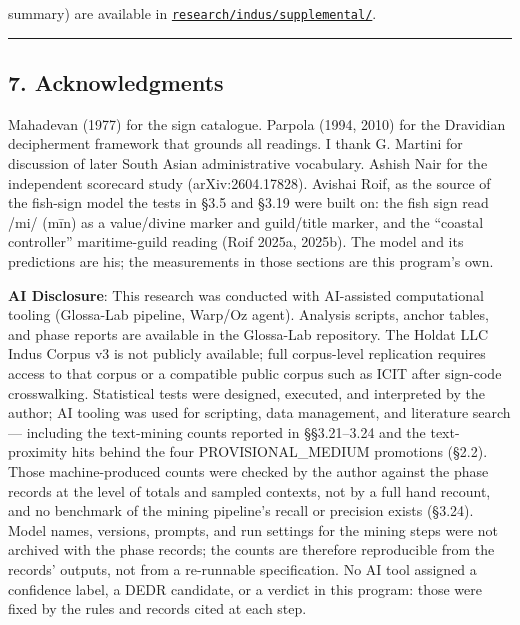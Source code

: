 \documentclass[
]{article}
\begin{document}
summary) are available in \href{https://github.com/BitConcepts/glossa-lab/tree/main/research/indus/supplemental}{\texttt{research/\allowbreak indus/\allowbreak supplemental/}}.

\begin{center}\rule{0.5\linewidth}{0.5pt}\end{center}

\subsection{7. Acknowledgments}\label{acknowledgments}

Mahadevan (1977) for the
sign catalogue. Parpola (1994, 2010) for the Dravidian decipherment
framework that grounds all readings. I thank G. Martini for discussion of later South Asian administrative vocabulary.
Ashish Nair for the independent scorecard study (arXiv:2604.17828).
Avishai Roif, as the source of the fish-sign model the tests in
\S3.5 and \S3.19 were built on: the fish sign read /mi/ (m\={i}n)
as a value/divine marker and guild/title marker, and the
``coastal controller'' maritime-guild reading (Roif 2025a, 2025b).
The model and its predictions are his; the measurements in those
sections are this program's own.

\textbf{AI Disclosure}: This research was conducted with AI-assisted
computational tooling (Glossa-Lab pipeline, Warp/Oz agent). Analysis scripts, anchor tables, and phase reports are available in the Glossa-Lab repository. The Holdat LLC Indus Corpus v3 is not publicly available; full corpus-level replication requires access to that corpus or a compatible public corpus such as ICIT after sign-code crosswalking. Statistical tests were designed, executed, and interpreted by the author; AI tooling was used for scripting, data management, and literature search --- including the text-mining counts reported in §§3.21--3.24 and the text-proximity hits behind the four PROVISIONAL\_MEDIUM promotions (§2.2). Those machine-produced counts were checked by the author against the phase records at the level of totals and sampled contexts, not by a full hand recount, and no benchmark of the mining pipeline's recall or precision exists (§3.24). Model names, versions, prompts, and run settings for the mining steps were not archived with the phase records; the counts are therefore reproducible from the records' outputs, not from a re-runnable specification. No AI tool assigned a confidence label, a DEDR candidate, or a verdict in this program: those were fixed by the rules and records cited at each step.
\end{document}
